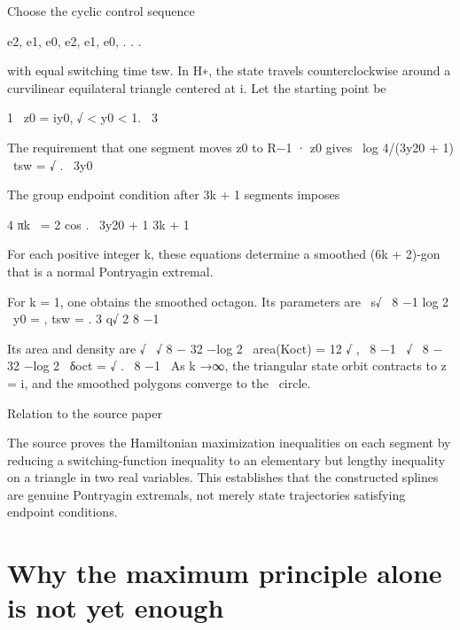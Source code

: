 Choose the cyclic control sequence


e2, e1, e0, e2, e1, e0, . . .


with equal switching time tsw. In H∗, the state travels counterclockwise around a curvilinear equilateral triangle centered at i. Let the starting point be


\begin{displaytext}
1 \
z0 = iy0, √ < y0 < 1. \
3
\end{displaytext}

\begin{displaytext}
The requirement that one segment moves z0 to R−1 · z0 gives \
log 4/(3y20 + 1) \
tsw = √ . \
3y0
\end{displaytext}

The group endpoint condition after 3k + 1 segments imposes


\begin{displaytext}
4 πk \
= 2 cos . \
3y20 + 1 3k + 1
\end{displaytext}

For each positive integer k, these equations determine a smoothed (6k + 2)-gon that is a normal Pontryagin extremal.


\begin{displaytext}
For k = 1, one obtains the smoothed octagon. Its parameters are \
s√ \
8 −1 log 2 \
y0 = , tsw = . 3 q√ 2 8 −1
\end{displaytext}

\begin{displaytext}
Its area and density are √ \
√ 8 − 32 −log 2 \
area(Koct) = 12 √ , \
8 −1 \
√ \
8 − 32 −log 2 \
δoct = √ . \
8 −1 \
As k →∞, the triangular state orbit contracts to z = i, and the smoothed polygons converge to the \
circle.
\end{displaytext}

\begin{insightbox}{Relation to the source paper}
\end{insightbox}

The source proves the Hamiltonian maximization inequalities on each segment by reducing a switching-function inequality to an elementary but lengthy inequality on a triangle in two real variables. This establishes that the constructed splines are genuine Pontryagin extremals, not merely state trajectories satisfying endpoint conditions.


\section{Why the maximum principle alone is not yet enough}


